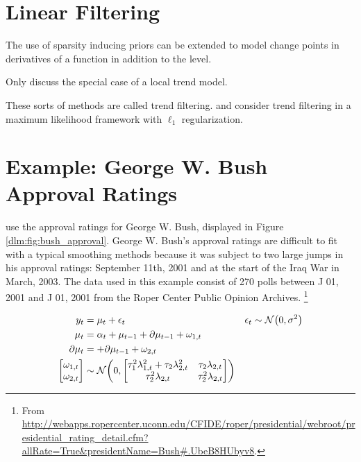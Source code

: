 \section{Linear Filtering}
\label{dlm:sec:linear-filtering}


The use of sparsity inducing priors can be extended to model change points in derivatives of a function in addition to the level.

Only discuss the special case of a local trend model.

These sorts of methods are called trend filtering.
\textcite{Tibshirani2014} and \textcite{KimKohBoydEtAl2009} consider trend filtering in a maximum likelihood framework with $\ell_{1}$ regularization.



\section{Example: George W. Bush Approval Ratings}
\label{dlm:sec:george-w.-bush}

\textcite{RatkovicEng2010} use the approval ratings for George W. Bush, displayed in Figure \ref{dlm:fig:bush_approval}.
George W. Bush's approval ratings are difficult to fit with a typical smoothing methods because it was subject to two large jumps in his approval ratings: September 11th, 2001 and at the start of the Iraq War in March, 2003.
The data used in this example consist of 270 polls between J 01, 2001 and J 01, 2001 from the Roper Center Public Opinion Archives.%
\footnote{From \url{http://webapps.ropercenter.uconn.edu/CFIDE/roper/presidential/webroot/presidential_rating_detail.cfm?allRate=True\&presidentName=Bush\#.UbeB8HUbyv8}.}

\begin{equation}
  \label{dlm:eq:20}
  \begin{aligned}[t]
    y_{t} &= \mu_{t} + \epsilon_{t} & \epsilon_{t} & \sim \mathcal{N}\mathopen{}\left(0, \sigma^{2}\right)\mathclose{} \\
    \mu_{t} &= \alpha_{t} +  \mu_{t - 1} + \partial \mu_{t - 1} + \omega_{1, t} \\
    \partial \mu_{t} &= + \partial \mu_{t - 1} + \omega_{2, t} \\
    \begin{bmatrix}
      \omega_{1, t} \\
      \omega_{2, t}
    \end{bmatrix} &
                    \sim \mathcal{N}\mathopen{}\left(0,
                    \begin{bmatrix}
                      \tau_{1}^{2} \lambda_{1, t}^{2} + \tau_{2} \lambda_{2, t}^{2} & \tau_{2} \lambda_{2, t} \\
                      \tau_{2}^{2} \lambda_{2, t} & \tau_{2}^{2} \lambda_{2, t}
                    \end{bmatrix}
                    \right)\mathclose{}
  \end{aligned}
\end{equation}


